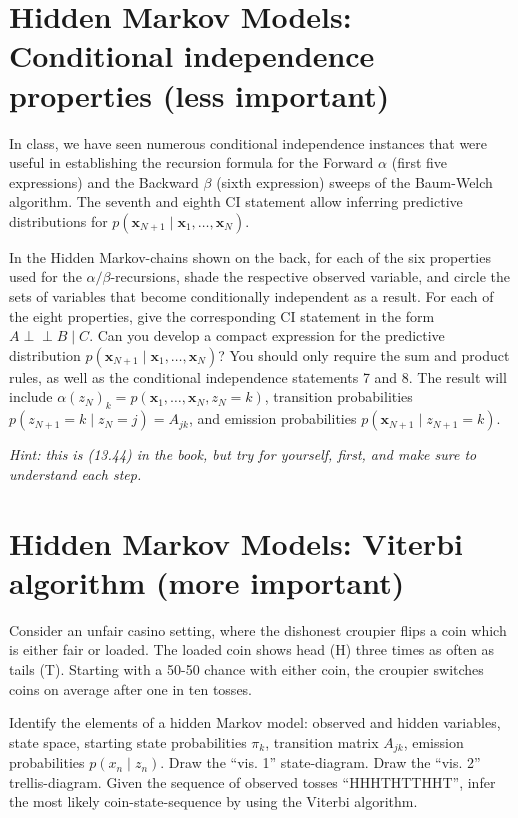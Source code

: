 \documentclass[11pt,noanswers,addpoints]{exam}
\newcommand{\x}{\mathbf x}
\newcommand{\Perp}{\mathrel{\perp\!\!\!\!\!\perp}}
\begin{document}
\section{Hidden Markov Models: Conditional independence properties (less important)} In class, we have seen numerous conditional independence instances that were useful in establishing the recursion formula for the Forward $\alpha$ (first five expressions) and the Backward $\beta$ (sixth expression) sweeps of the Baum-Welch algorithm. The seventh and eighth CI statement allow inferring predictive distributions for $p(\x_{N+1}\mid \x_1,\ldots,\x_N)$.
\begin{questions}
\question In the Hidden Markov-chains shown on the back, for each of the six properties used for the $\alpha/\beta$-recursions, shade the respective observed variable, and circle the sets of variables that become conditionally independent as a result.
\question For each of the eight properties, give the corresponding CI statement in the form $A \Perp B \mid C$.
\question Can you develop a compact expression for the predictive distribution $p(\x_{N+1}\mid \x_1,\ldots,\x_N)$? You should only require the sum and product rules, as well as the conditional independence statements 7 and 8. The result will include $\alpha(z_N)_k=p(\x_1,\ldots,\x_N, z_N=k)$, transition probabilities $p(z_{N+1}=k\mid z_N=j)=A_{jk}$, and emission probabilities $p(\x_{N+1}\mid z_{N+1}=k)$.

 \emph{Hint: this is (13.44) in the book, but try for yourself, first, and make sure to understand each step.}
\end{questions}

\section{Hidden Markov Models: Viterbi algorithm  (more important)}
Consider an unfair casino setting, where the dishonest croupier flips a coin which is either fair or loaded. The loaded coin shows head (H) three times as often as tails (T). Starting with a 50-50 chance with either coin, the croupier switches coins on average after one in ten tosses.
\begin{questions}
\question Identify the elements of a hidden Markov model: observed and hidden variables, state space, starting state probabilities $\pi_k$, transition matrix $A_{jk}$, emission probabilities $p(x_n\mid z_n)$.
\question Draw the ``vis. 1'' state-diagram.
\question Draw the ``vis. 2'' trellis-diagram.
\question Given the sequence of observed tosses ``HHHTHTTHHT'', infer the most likely coin-state-sequence by using the Viterbi algorithm.
\end{questions}

\clearpage
\\[2mm]

\\[2mm]

\\[2mm]

\\[2mm]

\\[2mm]

\\[2mm]
\end{document}
